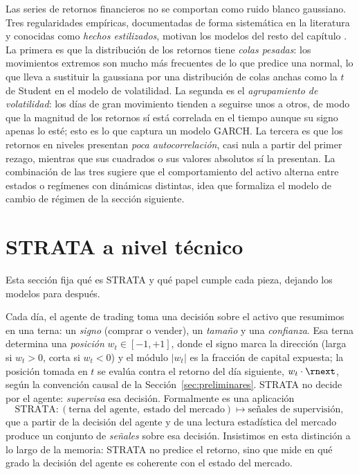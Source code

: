Las series de retornos financieros no se comportan como ruido blanco gaussiano. Tres regularidades empíricas, documentadas de forma sistemática en la literatura y conocidas como \emph{hechos estilizados}, motivan los modelos del resto del capítulo \cite{engle1982}. La primera es que la distribución de los retornos tiene \emph{colas pesadas}: los movimientos extremos son mucho más frecuentes de lo que predice una normal, lo que lleva a sustituir la gaussiana por una distribución de colas anchas como la $t$ de Student en el modelo de volatilidad. La segunda es el \emph{agrupamiento de volatilidad}: los días de gran movimiento tienden a seguirse unos a otros, de modo que la magnitud de los retornos sí está correlada en el tiempo aunque su signo apenas lo esté; esto es lo que captura un modelo GARCH. La tercera es que los retornos en niveles presentan \emph{poca autocorrelación}, casi nula a partir del primer rezago, mientras que sus cuadrados o sus valores absolutos sí la presentan. La combinación de las tres sugiere que el comportamiento del activo alterna entre estados o regímenes con dinámicas distintas, idea que formaliza el modelo de cambio de régimen de la sección siguiente.

\section{STRATA a nivel técnico}
\label{sec:strata-tecnico}

Esta sección fija qué es STRATA y qué papel cumple cada pieza, dejando los modelos para después.

Cada día, el agente de trading toma una decisión sobre el activo que resumimos en una terna: un \emph{signo} (comprar o vender), un \emph{tamaño} y una \emph{confianza}. Esa terna determina una \emph{posición} $w_t \in [-1, +1]$, donde el signo marca la dirección (larga si $w_t > 0$, corta si $w_t < 0$) y el módulo $|w_t|$ es la fracción de capital expuesta; la posición tomada en $t$ se evalúa contra el retorno del día siguiente, $w_t \cdot \rnext$, según la convención causal de la Sección~\ref{sec:preliminares}. STRATA no decide por el agente: \emph{supervisa} esa decisión. Formalmente es una aplicación
\[
\mathrm{STRATA}\colon (\text{terna del agente},\ \text{estado del mercado}) \longmapsto \text{señales de supervisión},
\]
que a partir de la decisión del agente y de una lectura estadística del mercado produce un conjunto de \emph{señales} sobre esa decisión. Insistimos en esta distinción a lo largo de la memoria: STRATA no predice el retorno, sino que mide en qué grado la decisión del agente es coherente con el estado del mercado.

